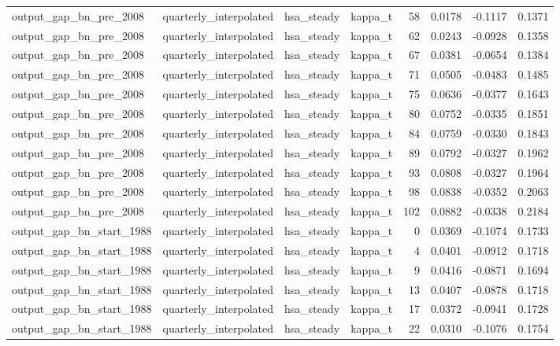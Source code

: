\begin{tabular}{llllrrrr}
output\_gap\_bn\_pre\_2008 & quarterly\_interpolated & hsa\_steady & kappa\_t & 58 & 0.0178 & -0.1117 & 0.1371 \\
output\_gap\_bn\_pre\_2008 & quarterly\_interpolated & hsa\_steady & kappa\_t & 62 & 0.0243 & -0.0928 & 0.1358 \\
output\_gap\_bn\_pre\_2008 & quarterly\_interpolated & hsa\_steady & kappa\_t & 67 & 0.0381 & -0.0654 & 0.1384 \\
output\_gap\_bn\_pre\_2008 & quarterly\_interpolated & hsa\_steady & kappa\_t & 71 & 0.0505 & -0.0483 & 0.1485 \\
output\_gap\_bn\_pre\_2008 & quarterly\_interpolated & hsa\_steady & kappa\_t & 75 & 0.0636 & -0.0377 & 0.1643 \\
output\_gap\_bn\_pre\_2008 & quarterly\_interpolated & hsa\_steady & kappa\_t & 80 & 0.0752 & -0.0335 & 0.1851 \\
output\_gap\_bn\_pre\_2008 & quarterly\_interpolated & hsa\_steady & kappa\_t & 84 & 0.0759 & -0.0330 & 0.1843 \\
output\_gap\_bn\_pre\_2008 & quarterly\_interpolated & hsa\_steady & kappa\_t & 89 & 0.0792 & -0.0327 & 0.1962 \\
output\_gap\_bn\_pre\_2008 & quarterly\_interpolated & hsa\_steady & kappa\_t & 93 & 0.0808 & -0.0327 & 0.1964 \\
output\_gap\_bn\_pre\_2008 & quarterly\_interpolated & hsa\_steady & kappa\_t & 98 & 0.0838 & -0.0352 & 0.2063 \\
output\_gap\_bn\_pre\_2008 & quarterly\_interpolated & hsa\_steady & kappa\_t & 102 & 0.0882 & -0.0338 & 0.2184 \\
output\_gap\_bn\_start\_1988 & quarterly\_interpolated & hsa\_steady & kappa\_t & 0 & 0.0369 & -0.1074 & 0.1733 \\
output\_gap\_bn\_start\_1988 & quarterly\_interpolated & hsa\_steady & kappa\_t & 4 & 0.0401 & -0.0912 & 0.1718 \\
output\_gap\_bn\_start\_1988 & quarterly\_interpolated & hsa\_steady & kappa\_t & 9 & 0.0416 & -0.0871 & 0.1694 \\
output\_gap\_bn\_start\_1988 & quarterly\_interpolated & hsa\_steady & kappa\_t & 13 & 0.0407 & -0.0878 & 0.1718 \\
output\_gap\_bn\_start\_1988 & quarterly\_interpolated & hsa\_steady & kappa\_t & 17 & 0.0372 & -0.0941 & 0.1728 \\
output\_gap\_bn\_start\_1988 & quarterly\_interpolated & hsa\_steady & kappa\_t & 22 & 0.0310 & -0.1076 & 0.1754 \\

\end{tabular}
